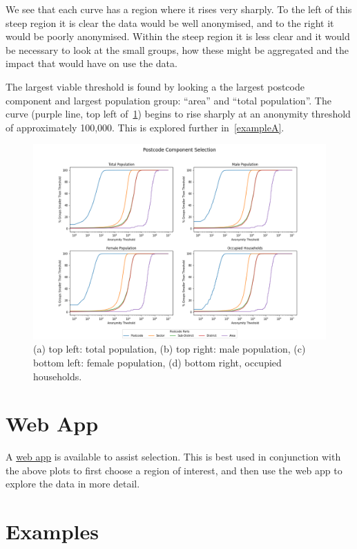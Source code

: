 \documentclass[12pt, a4paper]{article}
\begin{document}
We see that each curve has a region where it rises very sharply. To the left of this steep region it is clear the data would be well anonymised, and to the right it would be poorly anonymised. Within the steep region it is less clear and it would be necessary to look at the small groups, how these might be aggregated and the impact that would have on use the data.

The largest viable threshold is found by looking a the largest postcode component and largest population group: ``area'' and ``total population''. The curve (purple line, top left of~\cref{fig:postcode_selection}) begins to rise sharply at an anonymity threshold of approximately 100,000. This is explored further in~\cref{exampleA}.

\begin{figure}
\includegraphics[width=1\textwidth,trim={3cm, 0cm, 3cm, 0cm},clip]{images/postcode_selection.png}
\caption{(a) top left: total population, (b) top right: male population, (c) bottom left: female population, (d) bottom right, occupied households.}\label{fig:postcode_selection}
\end{figure}

\section{Web App}\label{lookup-utlity}

A \href{https://share.streamlit.io/adhardy/mirador-task-sheet/main}{web app} is available to assist selection. This is best used in conjunction with the above plots to first choose a region of interest, and then use the web app to explore the data in more detail.

\section{Examples}
\end{document}
